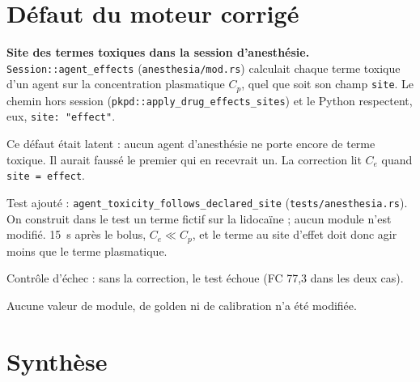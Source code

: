 \documentclass[10pt,a4paper]{article}
\newcommand{\cmd}[1]{\texttt{#1}}
\begin{document}
\section{Défaut du moteur corrigé}

\textbf{Site des termes toxiques dans la session d'anesthésie.} \cmd{Session::agent\_effects} (\cmd{anesthesia/mod.rs}) calculait chaque terme toxique d'un agent sur la concentration plasmatique $C_p$, quel que soit son champ \cmd{site}. Le chemin hors session (\cmd{pkpd::apply\_drug\_effects\_sites}) et le Python respectent, eux, \cmd{site: "effect"}.

Ce défaut était latent : aucun agent d'anesthésie ne porte encore de terme toxique. Il aurait faussé le premier qui en recevrait un. La correction lit $C_e$ quand \cmd{site = effect}.

Test ajouté : \cmd{agent\_toxicity\_follows\_declared\_site} (\cmd{tests/anesthesia.rs}). On construit dans le test un terme fictif sur la lidocaïne ; aucun module n'est modifié. \SI{15}{s} après le bolus, $C_e \ll C_p$, et le terme au site d'effet doit donc agir moins que le terme plasmatique.

Contrôle d'échec : sans la correction, le test échoue (FC 77,3 dans les deux cas).

Aucune valeur de module, de golden ni de calibration n'a été modifiée.

\section{Synthèse}
\end{document}
